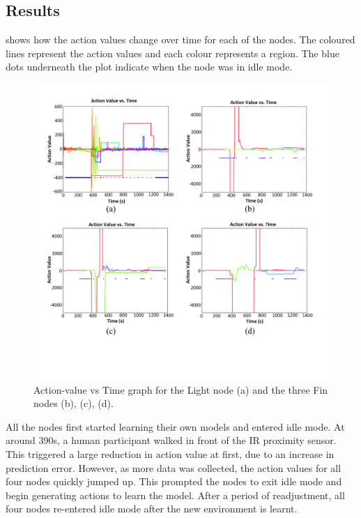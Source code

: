 \subsection{Results}

 shows how the action values change over time for each of the nodes. The coloured lines represent the action values and each colour represents a region. The blue dots underneath the plot indicate when the node was in idle mode.

\begin{figure} [!htbp]
	\centering
	\includegraphics[width=1.0\textwidth]{"fig/validations/Single_Cluster Action Value Vs Time"}
	\caption[Action value vs time graph for the Single Cluster Experiment]{Action-value vs Time graph for the Light node (a) and the three Fin nodes (b), (c), (d).}
	\label{fig:Single_Cluster Action Value Vs Time}
\end{figure}

All the nodes first started learning their own models and entered idle mode. At around 390s, a human participant walked in front of the IR proximity sensor. This triggered a large reduction in action value at first, due to an increase in prediction error. However, as more data was collected, the action values for all four nodes quickly jumped up. This prompted the nodes to exit idle mode and begin generating actions to learn the model. After a period of readjustment, all four nodes re-entered idle mode after the new environment is learnt. 

